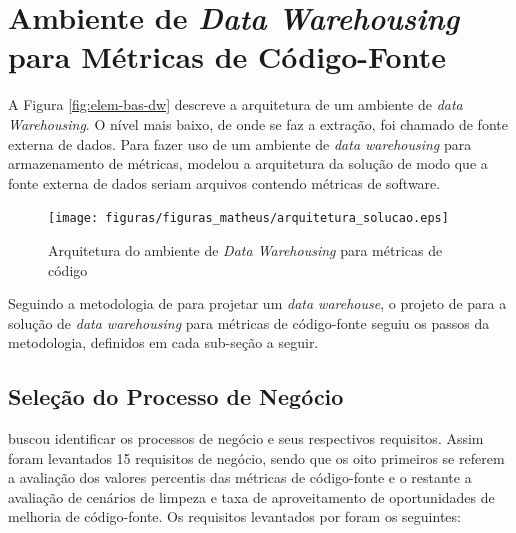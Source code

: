 \section{Ambiente de \textit{Data Warehousing} para Métricas de Código-Fonte}

A Figura \ref{fig:elem-bas-dw} descreve a arquitetura de um ambiente de \textit{data Warehousing}. O nível mais baixo, de onde se faz a extração, foi chamado de fonte externa de dados. Para fazer uso de um ambiente de \textit{data warehousing} para armazenamento de métricas,  modelou a arquitetura da solução de modo que a fonte externa de dados seriam arquivos contendo métricas de software.

\begin{figure}[h!]
\centering
\texttt{[image: figuras/figuras\_matheus/arquitetura\_solucao.eps]}
\caption{Arquitetura do ambiente de \textit{Data Warehousing} para métricas de código}
\label{fig:arquitetura_solucao}
\end{figure}
\FloatBarrier

Seguindo a metodologia de  para projetar um \textit{data warehouse}, o projeto de  para a solução de \textit{data warehousing} para métricas de código-fonte seguiu os passos da metodologia, definidos em cada sub-seção a seguir.

\subsection{Seleção do Processo de Negócio}

 buscou identificar os processos de negócio e seus respectivos requisitos. Assim foram levantados 15 requisitos de negócio, sendo que os oito primeiros se referem a avaliação dos valores percentis das métricas de código-fonte e o restante a avaliação de cenários de limpeza e taxa de aproveitamento de oportunidades de melhoria de código-fonte. Os requisitos levantados por  foram os seguintes:

